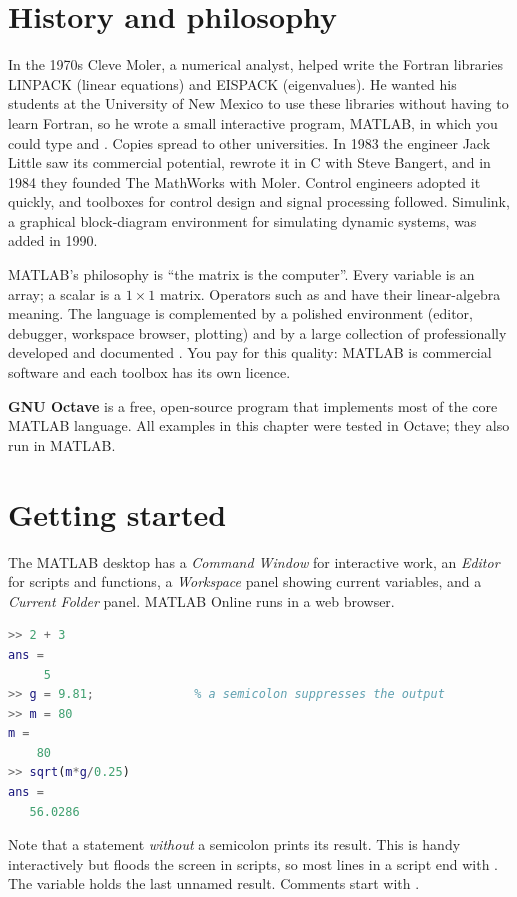 
\section{History and philosophy}

\begin{history}
In the 1970s Cleve Moler, a numerical analyst, helped write the Fortran libraries LINPACK
(linear equations) and EISPACK (eigenvalues). He wanted his students at the University of
New Mexico to use these libraries without having to learn Fortran, so he wrote a small
interactive program, MATLAB, in which you could type  and .
Copies spread to other universities. In 1983 the engineer Jack Little saw its commercial
potential, rewrote it in C with Steve Bangert, and in 1984 they founded The MathWorks with
Moler. Control engineers adopted it quickly, and toolboxes for control design and signal
processing followed. Simulink, a graphical block-diagram environment for simulating
dynamic systems, was added in 1990.
\end{history}

MATLAB's philosophy is ``the matrix is the computer''. Every variable is an array; a
scalar is a $1\times1$ matrix. Operators such as \code{*} and \code{\textbackslash} have
their linear-algebra meaning. The language is complemented by a polished environment
(editor, debugger, workspace browser, plotting) and by a large collection of professionally
developed and documented . You pay for this quality: MATLAB is commercial
software and each toolbox has its own licence.

\textbf{GNU Octave} is a free, open-source program that implements most of the core MATLAB
language. All examples in this chapter were tested in Octave; they also run in MATLAB.

\section{Getting started}

The MATLAB desktop has a \emph{Command Window} for interactive work, an \emph{Editor} for
scripts and functions, a \emph{Workspace} panel showing current variables, and a
\emph{Current Folder} panel. MATLAB Online runs in a web browser.
\begin{lstlisting}[language=Matlab]
>> 2 + 3
ans =
     5
>> g = 9.81;              % a semicolon suppresses the output
>> m = 80
m =
    80
>> sqrt(m*g/0.25)
ans =
   56.0286
\end{lstlisting}
Note that a statement \emph{without} a semicolon prints its result. This is handy
interactively but floods the screen in scripts, so most lines in a script end with
\code{;}. The variable  holds the last unnamed result. Comments start with
\code{\%}.

